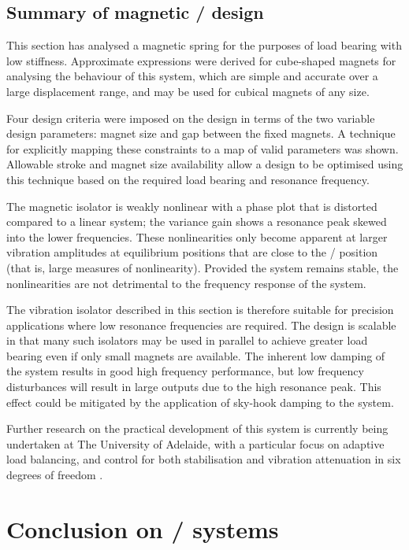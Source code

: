 \documentclass[11pt,a4paper]{memoir}
\begin{document}
\subsection{Summary of magnetic \qzs/ design}

This section has analysed a magnetic spring for the purposes of
load bearing with low stiffness. Approximate expressions
were derived for cube-shaped magnets for analysing the behaviour of
this system, which are simple and accurate over a large displacement range, and may be used for cubical magnets of any size.

Four design criteria were imposed on the design in terms of the two variable design
parameters: magnet size and gap between the fixed magnets. A technique for explicitly
mapping these constraints to a map of valid parameters was shown. Allowable stroke
and magnet size availability allow a design to be optimised using this technique
based on the required load bearing and resonance frequency.

The magnetic isolator is weakly nonlinear with a phase plot that is distorted compared to
a linear system; the variance gain shows a resonance peak skewed into the lower
frequencies. These nonlinearities only become apparent at larger vibration amplitudes
at equilibrium positions that are close to the \qzs/ position
(that is, large measures of nonlinearity). Provided the system remains stable,
the nonlinearities are not detrimental to the frequency response of the system.

The vibration isolator described in this section is therefore suitable for
precision applications where low resonance frequencies are required. The
design is scalable in that many such isolators may be used in parallel to
achieve greater load bearing even if only small magnets are available. The
inherent low damping of the system results in good high frequency performance,
but low frequency disturbances will result in large outputs due to the high
resonance peak. This effect could be mitigated by the application of sky-hook
damping to the system.

Further research on the practical development of this system is currently being undertaken at The University of Adelaide, with a particular focus on adaptive load balancing, and control for both stabilisation and vibration attenuation in six degrees of freedom \cite{zhu2011-icmt}.

\section{Conclusion on \qzs/ systems}
\end{document}
